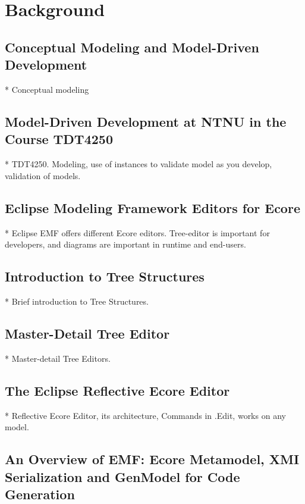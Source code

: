 \chapter{Background}\label{chap:background}


\section{Conceptual Modeling and Model-Driven Development}

* Conceptual modeling

\section{Model-Driven Development at NTNU in the Course TDT4250}

* TDT4250. Modeling, use of instances to validate model as you develop, validation of models.

\section{Eclipse Modeling Framework Editors for Ecore}

* Eclipse EMF offers different Ecore editors. Tree-editor is important for developers, and diagrams are important in runtime and end-users.

\section{Introduction to Tree Structures}

* Brief introduction to Tree Structures.

\section{Master-Detail Tree Editor}

* Master-detail Tree Editors. 

\section{The Eclipse Reflective Ecore Editor}

* Reflective Ecore Editor, its architecture, Commands in .Edit, works on any model.

\section{An Overview of EMF: Ecore Metamodel, XMI Serialization and GenModel for Code Generation}


